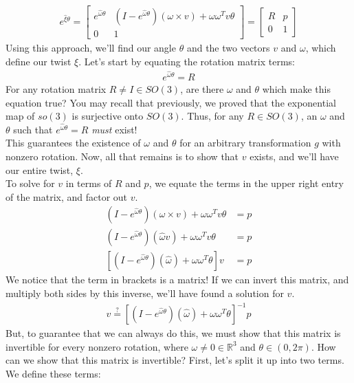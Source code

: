 \documentclass[oneside]{book}
\begin{document}
\begin{align}
    e^{\hat\xi\theta} = 
    \begin{bmatrix}
    e^{\hat\omega\theta} & (I - e^{\hat\omega\theta})( \omega\times v) + \omega\omega^Tv\theta\\
    0 & 1
    \end{bmatrix}
    = 
    \begin{bmatrix}
    R & p\\
    0 & 1
    \end{bmatrix}
\end{align}
Using this approach, we'll find our angle $\theta$ and the two vectors $v$ and $\omega$, which define our twist $\xi$. Let's start by equating the rotation matrix terms:
\begin{align}
    e^{\hat\omega\theta} = R
\end{align}
For any rotation matrix $R\neq I \in SO(3)$, are there $\omega$ and $\theta$ which make this equation true? You may recall that previously, we proved that the exponential map of $so(3)$ is surjective onto $SO(3)$. Thus, for any $R \in SO(3)$, an $\omega$ and $\theta$ such that $e^{\hat\omega\theta} = R$ \textit{must} exist!\\
This guarantees the existence of $\omega$ and $\theta$ for an arbitrary transformation $g$ with nonzero rotation. Now, all that remains is to show that $v$ exists, and we'll have our entire twist, $\xi$.\\
To solve for $v$ in terms of $R$ and $p$, we equate the terms in the upper right entry of the matrix, and factor out $v$.
\begin{align}
    (I - e^{\hat\omega\theta})( \omega\times v) + \omega\omega^Tv\theta &= p\\
    (I - e^{\hat\omega\theta})( \hat\omega v) + \omega\omega^Tv\theta &= p\\
    [(I - e^{\hat\omega\theta})( \hat\omega) + \omega\omega^T\theta]v &= p
\end{align}
We notice that the term in brackets is a matrix! If we can invert this matrix, and multiply both sides by this inverse, we'll have found a solution for $v$.
\begin{align}
    v \stackrel{?}{=} [(I - e^{\hat\omega\theta})( \hat\omega) + \omega\omega^T\theta]^{-1}p
\end{align}
But, to guarantee that we can always do this, we must show that this matrix is invertible for every nonzero rotation, where $\omega \neq 0 \in \mathbb{R}^3$ and $\theta \in (0, 2\pi)$. How can we show that this matrix is invertible? First, let's split it up into two terms. We define these terms:
\end{document}
